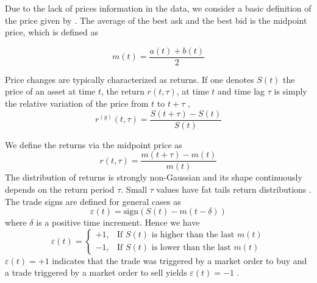 Due to the lack of prices information in the data, we consider a basic
definition of the price given by
\cite{patterns_forex,political_forex,forex_liquidity}. The average of the best
ask and the best bid is the midpoint price, which is defined as
\cite{prop_order_book,subtle_nature,Bouchaud_2004,large_prices_changes,em_stylized_facts,stat_theory,my_paper_response_financial,teach_spread}

\begin{equation}
    m \left(t\right) = \frac{a\left(t\right) + b\left(t\right)}{2}
\end{equation}

Price changes are typically characterized as returns. If one denotes
$S\left( t\right)$ the price of an asset at time $t$, the return
$r\left(t, \tau\right)$, at time $t$ and time lag $\tau$ is simply the relative
variation of the price from $t$ to $t + \tau$
\cite{subtle_nature,empirical_facts,asynchrony_effects_corr,tick_size_impact,causes_epps_effect,non_stationarity},
\begin{equation}\label{eq:return_general}
    r^{\left(g\right)} \left(t, \tau \right) = \frac{S\left(t + \tau\right)
    - S\left(t\right)}{S\left(t\right)}
\end{equation}

We define the returns via the midpoint price as
\begin{equation}\label{eq:midpoint_price_return}
    r\left(t,\tau\right) = \frac{m\left(t+\tau\right)-m\left(t\right)}
    {m\left(t\right)}
\end{equation}
The distribution of returns is strongly non-Gaussian and its shape continuously
depends on the return period $\tau$. Small $\tau$ values have fat tails return
distributions \cite{subtle_nature}. The trade signs are defined for general
cases as
\begin{equation}\label{eq:trade_sign_general}
    \varepsilon\left(t\right)=\text{sign}\left(S\left(t\right)
    -m\left(t-\delta\right)\right)
\end{equation}
where $\delta$ is a positive time increment. Hence we have
\begin{equation}\label{eq:trade_sign_results}
    \varepsilon\left(t\right)=\left\{
    \begin{array}{cc}
    +1, & \text{If } S\left(t\right)
    \text{ is higher than the last } m\left( t \right)\\
    -1, & \text{If } S\left(t\right)
    \text{ is lower than the last } m\left( t \right)
    \end{array}\right.
\end{equation}
$\varepsilon(t) = +1$ indicates that the trade was triggered by a market order
to buy and a trade triggered by a market order to sell yields
$\varepsilon(t) = -1$
\cite{subtle_nature,Bouchaud_2004,spread_changes_affect,quant_stock_price_response,order_flow_persistent}.

